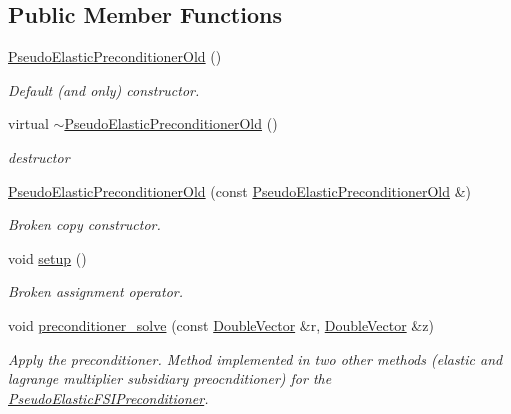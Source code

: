 \subsection*{Public Member Functions}
\begin{DoxyCompactItemize}
\item 
\hyperlink{classoomph_1_1PseudoElasticPreconditionerOld_a604bb3a8e087574657d28feee1cc2611}{Pseudo\+Elastic\+Preconditioner\+Old} ()
\begin{DoxyCompactList}\small\item\em Default (and only) constructor. \end{DoxyCompactList}\item 
virtual \hyperlink{classoomph_1_1PseudoElasticPreconditionerOld_a1e690693abc957640c99b63fe3c5c73f}{$\sim$\+Pseudo\+Elastic\+Preconditioner\+Old} ()
\begin{DoxyCompactList}\small\item\em destructor \end{DoxyCompactList}\item 
\hyperlink{classoomph_1_1PseudoElasticPreconditionerOld_a8186e3328b5b93186645812e79324843}{Pseudo\+Elastic\+Preconditioner\+Old} (const \hyperlink{classoomph_1_1PseudoElasticPreconditionerOld}{Pseudo\+Elastic\+Preconditioner\+Old} \&)
\begin{DoxyCompactList}\small\item\em Broken copy constructor. \end{DoxyCompactList}\item 
void \hyperlink{classoomph_1_1PseudoElasticPreconditionerOld_a25d542a5b98d70be1aa1dd6000402978}{setup} ()
\begin{DoxyCompactList}\small\item\em Broken assignment operator. \end{DoxyCompactList}\item 
void \hyperlink{classoomph_1_1PseudoElasticPreconditionerOld_a20b548d07e0f4116f59444ccb69d980f}{preconditioner\+\_\+solve} (const \hyperlink{classoomph_1_1DoubleVector}{Double\+Vector} \&r, \hyperlink{classoomph_1_1DoubleVector}{Double\+Vector} \&z)
\begin{DoxyCompactList}\small\item\em Apply the preconditioner. Method implemented in two other methods (elastic and lagrange multiplier subsidiary preocnditioner) for the \hyperlink{classoomph_1_1PseudoElasticFSIPreconditioner}{Pseudo\+Elastic\+F\+S\+I\+Preconditioner}. \end{DoxyCompactList}\item 

\end{DoxyCompactItemize}
